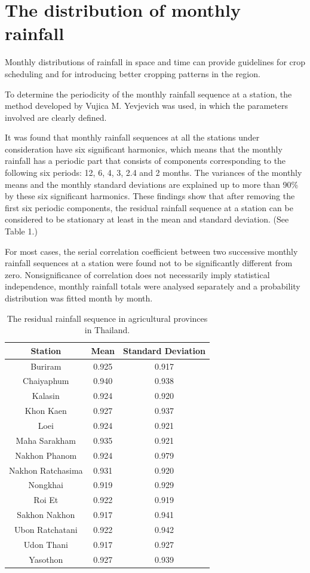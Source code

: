 \section*{The distribution of monthly rainfall}

Monthly distributions of rainfall in space and time can provide guidelines for crop scheduling and for introducing better cropping patterns in the region.

To determine the periodicity of the monthly rainfall sequence at a station, the method developed by Vujica M. Yevjevich was used, in which the parameters involved are clearly defined. 

It was found that monthly rainfall sequences at all the stations under consideration
have six significant harmonics, which means that the monthly rainfall has a periodic part that consists of components corresponding to the following six periods: 12, 6, 4, 3, 2.4 and 2 months. The variances of the monthly means and the monthly standard deviations are explained up to more than 90\%  by these six significant harmonics. These findings show that after removing the first six periodic components, the residual rainfall sequence at a station can be considered to be stationary at least in the mean and standard deviation. (See Table 1.)

For most cases, the serial correlation coefficient between two successive monthly
rainfall sequences at a station were found not to be significantly different from zero. Nonsignificance of correlation does not necessarily imply statistical independence, monthly rainfall totals were analysed separately and a probability distribution was fitted month by month.

\begin{table}
\centering
\begin{tabular}{ccc}
\toprule
Station & Mean & Standard Deviation\\
\midrule
Buriram & 0.925 & 0.917\\
Chaiyaphum & 0.940 & 0.938\\
Kalasin & 0.924 & 0.920\\
Khon Kaen & 0.927 & 0.937\\
Loei & 0.924 & 0.921\\
Maha Sarakham & 0.935 & 0.921\\
Nakhon Phanom & 0.924 & 0.979\\
Nakhon Ratchasima & 0.931 & 0.920\\
Nongkhai & 0.919 & 0.929\\
Roi Et & 0.922 & 0.919\\
Sakhon Nakhon & 0.917 & 0.941\\
Ubon Ratchatani & 0.922 & 0.942\\
Udon Thani & 0.917 & 0.927\\
Yasothon & 0.927 & 0.939\\
\bottomrule
\end{tabular}
\caption{\label{tab:first} The residual rainfall sequence in agricultural provinces in Thailand.}
\end{table}

